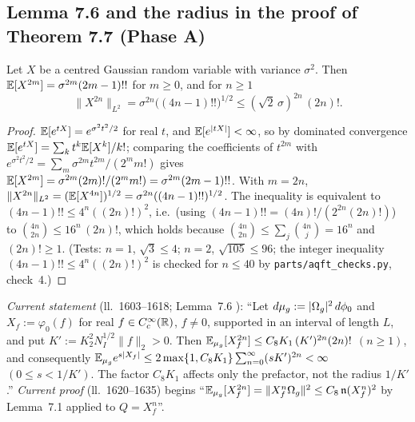 \subsection{Lemma 7.6 and the radius in the proof of Theorem 7.7 (Phase A)}\label{sub:cons-76}

\begin{auxlemma}\label{aux:consequences-moment}
Let $X$ be a centred Gaussian random variable with variance $\sigma^2$.  Then
$\mathbb{E}[X^{2m}]=\sigma^{2m}(2m-1)!!$ for $m\ge0$, and for $n\ge1$
\[
 \|X^{2n}\|_{L^2}=\sigma^{2n}\bigl((4n-1)!!\bigr)^{1/2}\le(\sqrt2\,\sigma)^{2n}\,(2n)! .
\]
\end{auxlemma}

\begin{proof}
$\mathbb{E}[e^{tX}]=e^{\sigma^2t^2/2}$ for real $t$, and $\mathbb{E}[e^{|tX|}]<\infty$, so by dominated
convergence $\mathbb{E}[e^{tX}]=\sum_kt^k\mathbb{E}[X^k]/k!$; comparing the coefficients of $t^{2m}$ with
$e^{\sigma^2t^2/2}=\sum_m\sigma^{2m}t^{2m}/(2^mm!)$ gives
$\mathbb{E}[X^{2m}]=\sigma^{2m}(2m)!/(2^mm!)=\sigma^{2m}(2m-1)!!$.  With $m=2n$,
$\|X^{2n}\|_{L^2}=(\mathbb{E}[X^{4n}])^{1/2}=\sigma^{2n}((4n-1)!!)^{1/2}$.  The inequality is equivalent to
$(4n-1)!!\le4^n((2n)!)^2$, i.e.\ (using $(4n-1)!!=(4n)!/(2^{2n}(2n)!)$) to
$\binom{4n}{2n}\le16^n\,(2n)!$, which holds because $\binom{4n}{2n}\le\sum_j\binom{4n}{j}=16^n$
and $(2n)!\ge1$.  (Tests: $n=1$, $\sqrt3\le4$; $n=2$, $\sqrt{105}\le96$; the integer
inequality $(4n-1)!!\le4^n((2n)!)^2$ is checked for $n\le40$ by \texttt{parts/aqft\_checks.py},
check~4.)
\end{proof}

\emph{Current statement} (ll.~1603--1618; Lemma~7.6 \cite[p.~22]{R}): ``Let
$d\mu_g:=|\Omega_g|^2\,d\phi_0$ and $X_f:=\varphi_0(f)$ for real $f\in C_c^\infty(\mathbb{R})$, $f\ne0$,
supported in an interval of length $L$, and put $K':=K_2^{2}N_I^{1/2}\|f\|_2>0$. Then
$\mathbb{E}_{\mu_g}[X_f^{2n}]\le C_8K_1\,(K')^{2n}(2n)!$ $(n\ge1)$, and consequently
$\mathbb{E}_{\mu_g}e^{s|X_f|}\le2\max\{1,C_8K_1\}\sum_{n=0}^\infty(sK')^{2n}<\infty$ $(0\le s<1/K')$. The
factor $C_8K_1$ affects only the prefactor, not the radius $1/K'$.''  \emph{Current proof}
(ll.~1620--1635) begins ``$\mathbb{E}_{\mu_g}[X_f^{2n}]=\|X_f^n\Omega_g\|^2\le C_8\,\mathfrak n(X_f^n)^2$ by
Lemma~7.1 applied to $Q=X_f^n$''.

